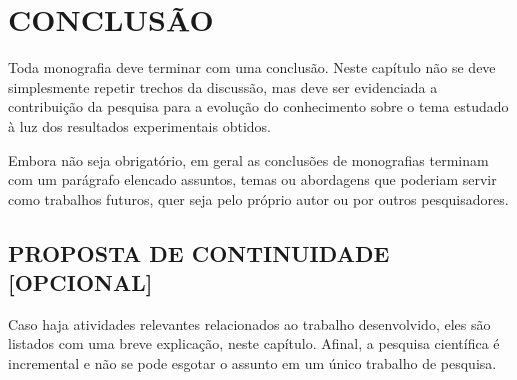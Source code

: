 \chapter{CONCLUSÃO}
\thispagestyle{empty}

Toda monografia deve terminar com uma conclusão. Neste capítulo não se deve simplesmente repetir trechos da discussão, mas deve ser evidenciada a contribuição da pesquisa para a evolução do conhecimento sobre o tema estudado à luz dos resultados experimentais obtidos.

Embora não seja obrigatório, em geral as conclusões de monografias terminam com um parágrafo elencado assuntos, temas ou abordagens que poderiam servir como trabalhos futuros, quer seja pelo próprio autor ou por outros pesquisadores.
\section{PROPOSTA DE CONTINUIDADE [OPCIONAL]}

Caso haja atividades relevantes relacionados ao trabalho desenvolvido, eles são listados com uma breve explicação, neste capítulo. Afinal, a pesquisa científica é incremental e não se pode esgotar o assunto em um único trabalho de pesquisa.
